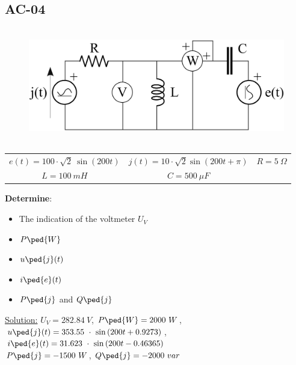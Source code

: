 \subsection{AC-04}
\begin{figure}[h]
\includegraphics[height=5cm]{img/2/04.png}
\centering
\end{figure}
\begin{center}
\begin{tabular}{ c c c }
    $e(t) = 100 \cdot \sqrt{2}\ \sin{(200t)}$ & $j(t) = 10 \cdot \sqrt{2} \sin{(200t + \pi)}$ & $R = 5\ \Omega$\\
    $L = 100\ mH$ & $C = 500\ \mu F$\\
\end{tabular}
\end{center}
\textbf{Determine}:
\begin{itemize}
  \item The indication of the voltmeter $U_V$
  \item $P\ped{W}$ 
  \item $u\ped{j}(t)$
  \item $i\ped{e}(t)$
  \item $P\ped{j}$ and $Q\ped{j}$
\end{itemize}
\underline{\large{Solution:}}
\newline
$U_V = 282.84\ V$, $P\ped{W} = 2000\ W$, $u\ped{j}(t) = 353.55\ \cdot\ \sin{(200t + 0.9273 )}$, $i\ped{e}(t) = 31.623\ \cdot\ \sin{(200t - 0.46365 )}$\\
$P\ped{j} = -1500\ W$,  $Q\ped{j} = -2000\ var$
\newline